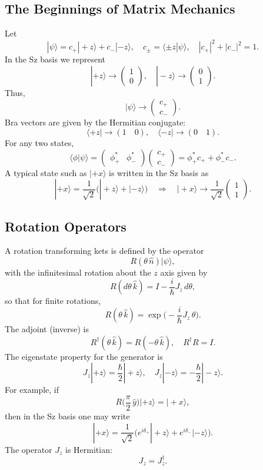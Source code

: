 \documentclass[twocolumn]{article}
\begin{document}
\begin{spacing}{1}
  \subsection{The Beginnings of Matrix Mechanics}
  Let 
  \[
  |\psi\rangle = c_{+}|+z\rangle + c_{-}|-z\rangle,\quad c_{\pm} = \langle\pm z|\psi\rangle,\quad |c_{+}|^2+|c_{-}|^2=1.
  \]
  In the Sz basis we represent
  \[
  |+z\rangle \longrightarrow \begin{pmatrix}1\\0\end{pmatrix},\quad
  |-z\rangle \longrightarrow \begin{pmatrix}0\\1\end{pmatrix}.
  \]
  Thus,
  \[
  |\psi\rangle \longrightarrow \begin{pmatrix} c_{+} \\ c_{-} \end{pmatrix}.
  \]
  Bra vectors are given by the Hermitian conjugate:
  \[
  \langle +z| \longrightarrow (1\quad 0),\quad \langle -z| \longrightarrow (0\quad 1).
  \]
  For any two states,
  \[
  \langle \phi|\psi\rangle = \begin{pmatrix} \phi_{+}^* & \phi_{-}^* \end{pmatrix} \begin{pmatrix} c_{+} \\ c_{-} \end{pmatrix} = \phi_{+}^* c_{+} + \phi_{-}^* c_{-}.
  \]
  A typical state such as \(|+x\rangle\) is written in the Sz basis as
  \[
  |+x\rangle = \frac{1}{\sqrt{2}} \Big( |+z\rangle + |-z\rangle \Big)
  \quad\Longrightarrow\quad
  |+x\rangle \longrightarrow \frac{1}{\sqrt{2}} \begin{pmatrix}1\\1\end{pmatrix}.
  \]
  
  \subsection{Rotation Operators}
  A rotation transforming kets is defined by the operator
  \[
  R(\theta\,\hat{n})|\psi\rangle,
  \]
  with the infinitesimal rotation about the \(z\) axis given by
  \[
  R(d\theta\,\hat{k}) = I - \frac{i}{\hbar}J_z\,d\theta,
  \]
  so that for finite rotations,
  \[
  R(\theta\,\hat{k}) = \exp\Big(-\frac{i}{\hbar}J_z\,\theta\Big).
  \]
  The adjoint (inverse) is
  \[
  R^\dagger(\theta\,\hat{k}) = R(-\theta\,\hat{k}),\quad R^\dagger R = I.
  \]
  The eigenstate property for the generator is
  \[
  J_z|+z\rangle = \frac{\hbar}{2}|+z\rangle,\quad J_z|-z\rangle = -\frac{\hbar}{2}|-z\rangle.
  \]
  For example, if
  \[
  R\Big(\frac{\pi}{2}\,\hat{y}\Big)|+z\rangle = |+x\rangle,
  \]
  then in the Sz basis one may write
  \[
  |+x\rangle = \frac{1}{\sqrt{2}} \Big(e^{i\delta_{+}}|+z\rangle + e^{i\delta_{-}}|-z\rangle\Big).
  \]
  The operator \(J_z\) is Hermitian:
  \[
  J_z=J_z^\dagger.
  \]
  

\end{spacing}
\end{document}
